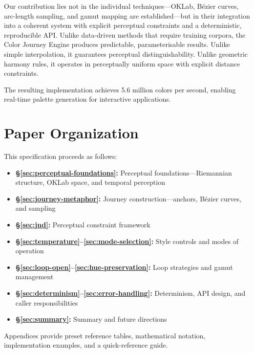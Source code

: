 Our contribution lies not in the individual techniques---OKLab, Bézier curves, arc-length sampling, and gamut mapping are established---but in their integration into a coherent system with explicit perceptual constraints and a deterministic, reproducible API. Unlike data-driven methods that require training corpora, the Color Journey Engine produces predictable, parameterisable results. Unlike simple interpolation, it guarantees perceptual distinguishability. Unlike geometric harmony rules, it operates in perceptually uniform space with explicit distance constraints.

The resulting implementation achieves 5.6 million colors per second, enabling real-time palette generation for interactive applications.

\section{Paper Organization}
\label{sec:organization}

This specification proceeds as follows:

\begin{itemize}
    \item \textbf{\S\ref{sec:perceptual-foundations}:} Perceptual foundations—Riemannian structure, OKLab space, and temporal perception
    \item \textbf{\S\ref{sec:journey-metaphor}:} Journey construction---anchors, Bézier curves, and sampling
    \item \textbf{\S\ref{sec:jnd}:} Perceptual constraint framework
    \item \textbf{\S\ref{sec:temperature}--\ref{sec:mode-selection}:} Style controls and modes of operation
    \item \textbf{\S\ref{sec:loop-open}--\ref{sec:hue-preservation}:} Loop strategies and gamut management
    \item \textbf{\S\ref{sec:determinism}--\ref{sec:error-handling}:} Determinism, API design, and caller responsibilities
    \item \textbf{\S\ref{sec:summary}:} Summary and future directions
\end{itemize}

Appendices provide preset reference tables, mathematical notation, implementation examples, and a quick-reference guide.
